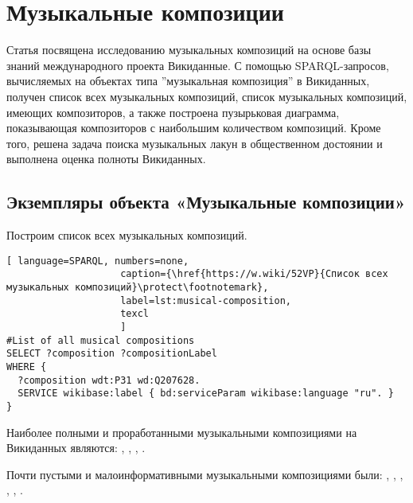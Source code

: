 \chapter{Музыкальные композиции}
\label{ch:musical-composition}
Статья посвящена исследованию музыкальных композиций на основе базы знаний международного проекта Викиданные. С помощью SPARQL-запросов, вычисляемых на объектах типа ”музыкальная композиция” в Викиданных, получен список всех музыкальных композиций, список музыкальных композиций, имеющих композиторов, а также построена пузырьковая диаграмма, показывающая композиторов с наибольшим количеством композиций. Кроме того, решена задача поиска музыкальных лакун в общественном достоянии и выполнена оценка полноты Викиданных.

\section{Экземпляры объекта «Музыкальные композиции»}

Построим список всех музыкальных композиций.

\begin{lstlisting}[ language=SPARQL, numbers=none,
                    caption={\href{https://w.wiki/52VP}{Список всех  музыкальных композиций}\protect\footnotemark},
                    label=lst:musical-composition,
                    texcl 
                    ]
#List of all musical compositions
SELECT ?composition ?compositionLabel 
WHERE {
  ?composition wdt:P31 wd:Q207628.
  SERVICE wikibase:label { bd:serviceParam wikibase:language "ru". }
}
\end{lstlisting}%

Наиболее полными и проработанными музыкальными композициями на Викиданных являются: , , , .

Почти пустыми и малоинформативными музыкальными композициями были: , , , , , .

